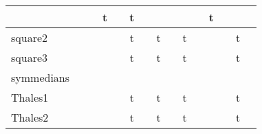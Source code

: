 {\begin{longtable}{|l|*{7}{cr|}}
& \cellcolor{yellow!25} & \cellcolor{yellow!25}{ 2} 
& \cellcolor{green!50}t & \cellcolor{green!50}{\bf 41} 
& \cellcolor{green!30}t & \cellcolor{green!30}{\sl 250} 
& \cellcolor{yellow!25} & \cellcolor{yellow!25}{ 85} 
& \cellcolor{yellow!25} & \cellcolor{yellow!25}{ 85} 
& \cellcolor{green!30}t & \cellcolor{green!30}{ 247} 
\\ \hline
\cellcolor{blue!10}square2 
& \cellcolor{yellow!25} & \cellcolor{yellow!25}{ 2} 
& \cellcolor{yellow!25} & \cellcolor{yellow!25}{ 2} 
& \cellcolor{green!50}t & \cellcolor{green!50}{\bf 40} 
& \cellcolor{green!30}t & \cellcolor{green!30}{\sl 243} 
& \cellcolor{green!40}t & \cellcolor{green!40}{ 113} 
& \cellcolor{yellow!25} & \cellcolor{yellow!25}{ 87} 
& \cellcolor{green!30}t & \cellcolor{green!30}{ 243} 
\\ \hline
\cellcolor{blue!10}square3 
& \cellcolor{yellow!25} & \cellcolor{yellow!25}{ 3} 
& \cellcolor{yellow!25} & \cellcolor{yellow!25}{ 9} 
& \cellcolor{green!50}t & \cellcolor{green!50}{\bf 38} 
& \cellcolor{green!30}t & \cellcolor{green!30}{\sl 246} 
& \cellcolor{green!40}t & \cellcolor{green!40}{ 98} 
& \cellcolor{yellow!25} & \cellcolor{yellow!25}{ 89} 
& \cellcolor{green!30}t & \cellcolor{green!30}{ 251} 
\\ \hline
\cellcolor{blue!10}symmedians 
& \cellcolor{yellow!25} & \cellcolor{yellow!25}{ 3} 
& \cellcolor{yellow!25} & \cellcolor{yellow!25}{ 3} 
& \cellcolor{yellow!25} & \cellcolor{yellow!25}{ 17} 
& \cellcolor{yellow!25} & \cellcolor{yellow!25}{ 236} 
& \cellcolor{yellow!25} & \cellcolor{yellow!25}{ 70} 
& \cellcolor{yellow!25} & \cellcolor{yellow!25}{ 71} 
& \cellcolor{yellow!25} & \cellcolor{yellow!25}{ 329} 
\\ \hline
\cellcolor{blue!10}Thales1 
& \cellcolor{yellow!25} & \cellcolor{yellow!25}{ 4} 
& \cellcolor{yellow!25} & \cellcolor{yellow!25}{ 2} 
& \cellcolor{green!50}t & \cellcolor{green!50}{\bf 38} 
& \cellcolor{green!30}t & \cellcolor{green!30}{\sl 243} 
& \cellcolor{green!30}t & \cellcolor{green!30}{ 191} 
& \cellcolor{yellow!25} & \cellcolor{yellow!25}{ t/o} 
& \cellcolor{green!30}t & \cellcolor{green!30}{ 266} 
\\ \hline
\cellcolor{blue!10}Thales2 
& \cellcolor{yellow!25} & \cellcolor{yellow!25}{ 2} 
& \cellcolor{yellow!25} & \cellcolor{yellow!25}{ 2} 
& \cellcolor{green!50}t & \cellcolor{green!50}{\bf 39} 
& \cellcolor{green!30}t & \cellcolor{green!30}{\sl 246} 
& \cellcolor{green!40}t & \cellcolor{green!40}{ 97} 
& \cellcolor{yellow!25} & \cellcolor{yellow!25}{ 80} 
& \cellcolor{green!30}t & \cellcolor{green!30}{ 258} 

\end{longtable}}
